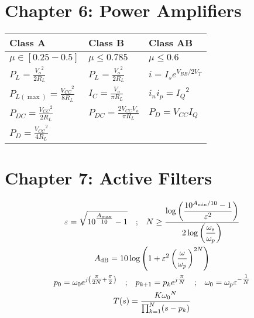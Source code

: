 \documentclass[a4paper]{article}
\begin{document}
\begin{multicols}{2}
	\section*{Chapter 6: Power Amplifiers}
	\renewcommand{\arraystretch}{1.7}
	\begin{tabular}{|l|l|l|}
		\hline
		Class A                                               & Class B                                              & Class AB                                  \\
		\hline
		$\mu \in [0.25-0.5]$                                  & $\mu \leq 0.785$                                     & $\mu \leq 0.6$                            \\
		$\displaystyle P_L = \frac{{V_o}^2}{2R_L}$            & $\displaystyle P_L = \frac{{V_o}^2}{2 R_L}$          & $\displaystyle i = I_s e^{V_{BB}/{2V_T}}$ \\
		$\displaystyle P_{L(\max)} = \frac{{V_{CC}}^2}{8R_L}$ & $\displaystyle I_C = \frac{V_o}{\pi R_L}$            & $\displaystyle i_n i_p = {I_Q}^2$         \\
		$\displaystyle P_{DC} = \frac{{V_{CC}}^2}{2R_L}$      & $\displaystyle P_{DC} = \frac{2V_{CC} V_o}{\pi R_L}$ & $\displaystyle P_D = V_{CC}I_Q$           \\
		$\displaystyle P_{D} = \frac{{V_{CC}}^2}{4R_L}$       &                                                      &                                           \\
		\hline
	\end{tabular}

	\section*{Chapter 7: Active Filters}
	\begin{gather*}
		\varepsilon = \sqrt{10^{\tfrac{A_{\max}}{10}} - 1}
		\qq{;}
		N \geq \frac{ \log\left(\dfrac{10^{A_{\min}/10} - 1}{\varepsilon^2}\right) }{ 2\log\left(\dfrac{\omega_s}{\omega_p}\right) } \\
		A_\text{dB} = 10 \log \left( 1 + \varepsilon^2 \left(\dfrac{\omega}{\omega_p} \right)^{2N} \right) \\
		p_0 = \omega_0 e^{j \left(\tfrac{\pi}{2N} + \tfrac{\pi}{2}\right)} \qq{;} p_{k+1} = p_k e^{j \tfrac{\pi}{N}} \qq{;} \omega_0 = \omega_p \varepsilon^{-\tfrac{1}{N}} \\
		T(s) = \frac{K {\omega_0}^N}{\prod_{k=1}^N (s-p_k)}
	\end{gather*}
\end{multicols}
\end{document}
